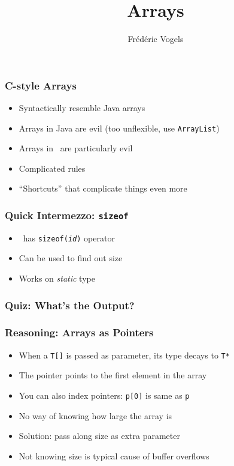 \documentclass[handout]{ucll-slides}
\title{Arrays}
\author{Fr\'ed\'eric Vogels}
\begin{document}
\begin{frame}
  \titlepage
\end{frame}

\begin{frame}
  \frametitle{C-style Arrays}
  \begin{itemize}
    \item Syntactically resemble Java arrays
    \item Arrays in Java are evil (too unflexible, use {\tt ArrayList})
    \item Arrays in \cpp\ are particularly evil
    \item Complicated rules
    \item ``Shortcuts'' that complicate things even more
  \end{itemize}
\end{frame}

\begin{frame}
  \frametitle{Quick Intermezzo: {\tt sizeof}}
  \begin{itemize}
    \item \cpp\ has {\tt sizeof({\it id})} operator
    \item Can be used to find out size
    \item Works on \emph{static} type
  \end{itemize}
\end{frame}

\begin{frame}
  \frametitle{Quiz: What's the Output?}
\end{frame}

\begin{frame}
  \frametitle{Reasoning: Arrays as Pointers}
  \begin{itemize}
    \item When a {\tt T[]} is passed as parameter, its type decays to {\tt T*}
    \item The pointer points to the first element in the array
    \item You can also index pointers: {\tt p[0]} is same as {\tt *p}
    \item No way of knowing how large the array is
    \item Solution: pass along size as extra parameter
    \item Not knowing size is typical cause of buffer overflows
  \end{itemize}
\end{frame}
\end{document}

